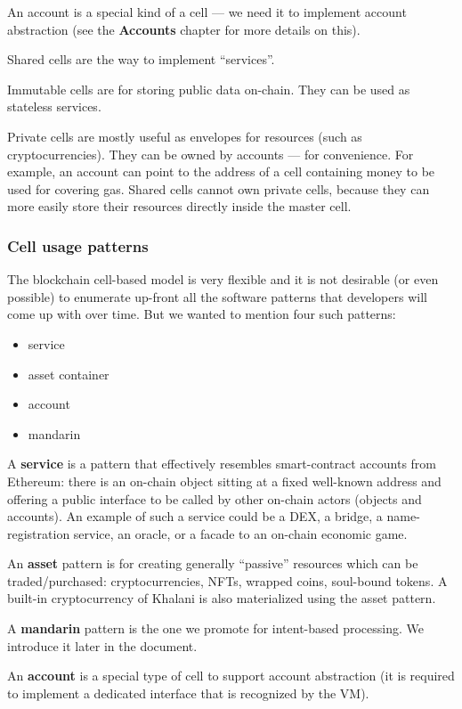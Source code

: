 \documentclass[a4paper]{article}
\begin{document}
An account is a special kind of a cell --- we need it to implement account abstraction (see the \textbf{Accounts} chapter for more details on this).

Shared cells are the way to implement ``services''.

Immutable cells are for storing public data on-chain. They can be used as stateless services.

Private cells are mostly useful as envelopes for resources (such as cryptocurrencies). They can be owned by accounts --- for convenience. For example, an account can point to the address of a cell containing money to be used for covering gas. Shared cells cannot own private cells, because they can more easily store their resources directly inside the master cell.

\subsubsection{Cell usage patterns}

The blockchain cell-based model is very flexible and it is not desirable (or even possible) to enumerate up-front all the software patterns that developers will come up with over time. But we wanted to mention four such patterns:

\begin{itemize}
  \item service
  \item asset container
  \item account
  \item mandarin
\end{itemize}

A \textbf{service} is a pattern that effectively resembles smart-contract accounts from Ethereum: there is an on-chain object sitting at a fixed well-known address and offering a public interface to be called by other on-chain actors (objects and accounts). An example of such a service could be a DEX, a bridge, a name-registration service, an oracle, or a facade to an on-chain economic game.

An \textbf{asset} pattern is for creating generally ``passive'' resources which can be traded/purchased: cryptocurrencies, NFTs, wrapped coins, soul-bound tokens. A built-in cryptocurrency of Khalani is also materialized using the asset pattern.

A \textbf{mandarin} pattern is the one we promote for intent-based processing. We introduce it later in the document.

An \textbf{account} is a special type of cell to support account abstraction (it is required to implement a dedicated interface that is recognized by the VM).
\end{document}

